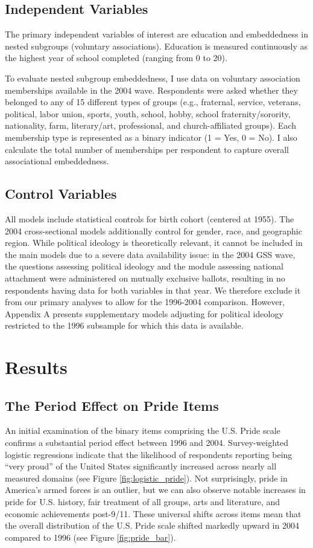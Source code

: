 \documentclass[12pt,letterpaper]{article}
\begin{document}
\subsection{Independent Variables}
The primary independent variables of interest are education and embeddedness in nested subgroups (voluntary associations). Education is measured continuously as the highest year of school completed (ranging from 0 to 20).

To evaluate nested subgroup embeddedness, I use data on voluntary association memberships available in the 2004 wave. Respondents were asked whether they belonged to any of 15 different types of groups (e.g., fraternal, service, veterans, political, labor union, sports, youth, school, hobby, school fraternity/sorority, nationality, farm, literary/art, professional, and church-affiliated groups). Each membership type is represented as a binary indicator (1 = Yes, 0 = No). I also calculate the total number of memberships per respondent to capture overall associational embeddedness. 

\subsection{Control Variables}
All models include statistical controls for birth cohort (centered at 1955). The 2004 cross-sectional models additionally control for gender, race, and geographic region. While political ideology is theoretically relevant, it cannot be included in the main models due to a severe data availability issue: in the 2004 GSS wave, the questions assessing political ideology and the module assessing national attachment were administered on mutually exclusive ballots, resulting in no respondents having data for both variables in that year. We therefore exclude it from our primary analyses to allow for the 1996-2004 comparison. However, Appendix A presents supplementary models adjusting for political ideology restricted to the 1996 subsample for which this data is available.

\section{Results}

\subsection{The Period Effect on Pride Items}

An initial examination of the binary items comprising the U.S. Pride scale confirms a substantial period effect between 1996 and 2004. Survey-weighted logistic regressions indicate that the likelihood of respondents reporting being ``very proud'' of the United States significantly increased across nearly all measured domains (see Figure \ref{fig:logistic_pride}). Not surprisingly, pride in America's armed forces is an outlier, but we can also observe notable increases in pride for U.S. history, fair treatment of all groups, arts and literature, and economic achievements post-9/11. These universal shifts across items mean that the overall distribution of the U.S. Pride scale shifted markedly upward in 2004 compared to 1996 (see Figure \ref{fig:pride_bar}).
\end{document}
